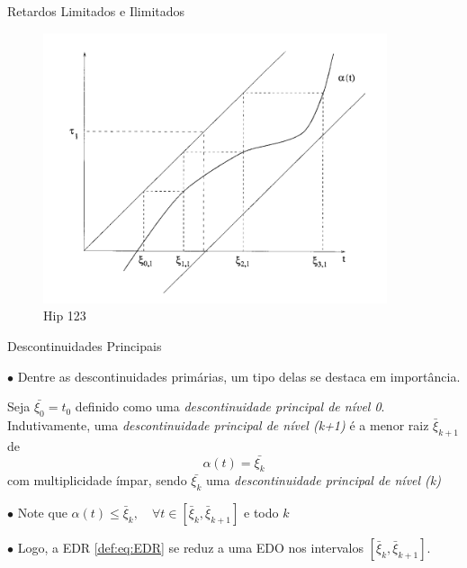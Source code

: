 \documentclass{beamer}
\theoremstyle{plain}
\theoremstyle{definition}
\begin{document}

\begin{frame}{Retardos Limitados e Ilimitados}

    \begin{figure}
        \begin{center}
            \includegraphics[width=0.9\textwidth, height=0.7\textheight]{hip123.png}
        \end{center}
        \caption{Hip 123}\label{fig:Desaparecimento do Retardo}
    \end{figure}

\end{frame}




\begin{frame}{Descontinuidades Principais}

    $\bullet$ Dentre as descontinuidades primárias, um tipo delas se destaca em importância.

    \begin{definition}
        \label{chap2:def:principal_descontinuity}
    Seja $\bar{\xi_0} = t_0$ definido como uma \textit{descontinuidade principal de nível 0}. Indutivamente, uma \textit{descontinuidade principal de nível (k+1)} é a menor raiz $\bar{\xi}_{k+1}$ de 
        \[
            \alpha(t) = \bar{\xi_k}
        \]
        com multiplicidade ímpar, sendo $\bar{\xi_k}$ uma \textit{descontinuidade principal de nível (k)}
    \end{definition}


    $\bullet$ Note que $ \alpha(t) \leq \bar{\xi}_{k}, \quad \forall t \in\left[\bar{\xi}_{k}, \bar{\xi}_{k+1}\right] $ e todo $k$

    $\bullet$ Logo, a EDR \eqref{def:eq:EDR} se reduz a uma EDO nos intervalos $\left[\bar{\xi}_{k}, \bar{\xi}_{k+1}\right]$. 

\end{frame}
\end{document}
